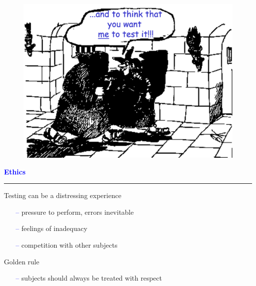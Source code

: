 \documentclass[pdf]{beamer}
\begin{document}
{{{{{{{{{{{{{\begin{frame}
    \begin{figure}[b]
    	\includegraphics[scale = 0.45, center]{35_Imagine.png}
    \end{figure}
\end{frame}



{
\begin{frame}
	\vspace{8mm}
	\textcolor{Blue}{\textbf{\large{Ethics}}}
    \textcolor{red}{\rule{10cm}{1mm}}


  {\Large Testing can be a distressing experience}
  \begin{itemize}
    \item[\textcolor{Blue}{--}] pressure to perform, errors inevitable
    \item[\textcolor{Blue}{--}] feelings of inadequacy
    \item[\textcolor{Blue}{--}] competition with other subjects
  \end{itemize}
  \vspace{12mm}
  {\Large Golden rule}
  \begin{itemize}
    \item[\textcolor{Blue}{--}] subjects should always be treated with respect
  \end{itemize}
\end{frame}



}}}}}}}}}}}}}}
\end{document}
